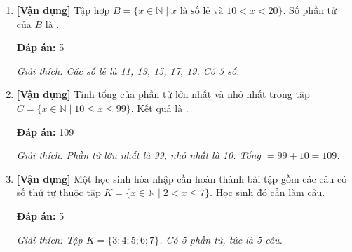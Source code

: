 \documentclass[12pt,a4paper]{article}
\newcommand{\vandung}{\textcolor{vandung}{\textbf{[Vận dụng]}}}
\newcommand{\dapan}[1]{\par\smallskip\textbf{Đáp án:} #1}
\newcommand{\giaithich}[1]{\par\textit{Giải thích: #1}}
\begin{document}
\begin{enumerate}[label=\textbf{Câu \arabic*.},resume]
    \item \vandung{} Tập hợp $B = \{x \in \mathbb{N} \mid x \text{ là số lẻ và } 10 < x < 20\}$. Số phần tử của $B$ là \underline{\hspace{2cm}}.
    \dapan{5}
    \giaithich{Các số lẻ là 11, 13, 15, 17, 19. Có 5 số.}

    \item \vandung{} Tính tổng của phần tử lớn nhất và nhỏ nhất trong tập $C = \{x \in \mathbb{N} \mid 10 \le x \le 99\}$. Kết quả là \underline{\hspace{2cm}}.
    \dapan{109}
    \giaithich{Phần tử lớn nhất là 99, nhỏ nhất là 10. Tổng $= 99 + 10 = 109$.}

    \item \vandung{} Một học sinh hòa nhập cần hoàn thành bài tập gồm các câu có số thứ tự thuộc tập $K = \{x \in \mathbb{N} \mid 2 < x \le 7\}$. Học sinh đó cần làm \underline{\hspace{2cm}} câu.
    \dapan{5}
    \giaithich{Tập $K = \{3; 4; 5; 6; 7\}$. Có 5 phần tử, tức là 5 câu.}
\end{enumerate}
\end{document}
